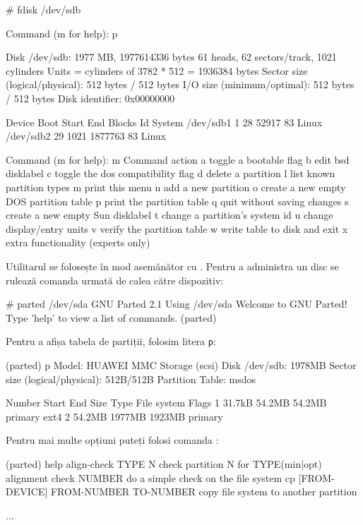 \begin{screen}
# fdisk /dev/sdb


Command (m for help): p


Disk /dev/sdb: 1977 MB, 1977614336 bytes
61 heads, 62 sectors/track, 1021 cylinders
Units = cylinders of 3782 * 512 = 1936384 bytes
Sector size (logical/physical): 512 bytes / 512 bytes
I/O size (minimum/optimal): 512 bytes / 512 bytes
Disk identifier: 0x00000000


   Device Boot      Start         End      Blocks   Id  System
/dev/sdb1               1          28       52917   83  Linux
/dev/sdb2              29        1021     1877763   83  Linux


Command (m for help): m
Command action
   a   toggle a bootable flag
   b   edit bsd disklabel
   c   toggle the dos compatibility flag
   d   delete a partition
   l   list known partition types
   m   print this menu
   n   add a new partition
   o   create a new empty DOS partition table
   p   print the partition table
   q   quit without saving changes
   s   create a new empty Sun disklabel
   t   change a partition's system id
   u   change display/entry units
   v   verify the partition table
   w   write table to disk and exit
   x   extra functionality (experts only)
\end{screen}

Utilitarul  se folosește în mod asemănător cu . Pentru a
administra un disc se rulează comanda  urmată de calea către
dispozitiv:

\begin{screen}
# parted /dev/sda
GNU Parted 2.1
Using /dev/sda
Welcome to GNU Parted! Type 'help' to view a list of commands.
(parted)
\end{screen}

Pentru a afișa tabela de partiții, folosim litera \texttt{p}:

\begin{screen}
(parted) p
Model: HUAWEI MMC Storage (scsi)
Disk /dev/sdb: 1978MB
Sector size (logical/physical): 512B/512B
Partition Table: msdos


Number  Start   End     Size    Type     File system  Flags
 1      31.7kB  54.2MB  54.2MB  primary  ext4
 2      54.2MB  1977MB  1923MB  primary
\end{screen}

Pentru mai multe opțiuni puteți folosi comanda :

\begin{screen}
(parted) help
  align-check TYPE N                        check partition N for TYPE(min|opt) alignment
  check NUMBER                             do a simple check on the file system
  cp [FROM-DEVICE] FROM-NUMBER TO-NUMBER   copy file system to another partition


...
\end{screen}

